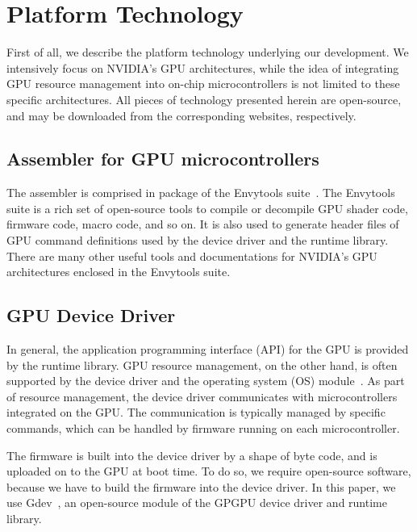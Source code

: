 
\section{Platform Technology}\label{sec:tech}

First of all, we describe the platform technology underlying our
development.
We intensively focus on NVIDIA's GPU architectures, while the idea of
integrating GPU resource management into on-chip microcontrollers is not
limited to these specific architectures.
All pieces of technology presented herein are open-source, and may be
downloaded from the corresponding websites, respectively.

\subsection{Assembler for GPU microcontrollers}\label{sec:envy}

The assembler is comprised in package of the Envytools suite~\cite{envytools}.
The Envytools suite is a rich set of open-source tools to compile or
decompile GPU shader code, firmware code, macro code, and so on. 
It is also used to generate header files of GPU command definitions used
by the device driver and the runtime library.
There are many other useful tools and documentations for NVIDIA's GPU
architectures enclosed in the Envytools suite.

\subsection{GPU Device Driver}\label{sec:driver}

In general, the application programming interface (API) for the GPU is
provided by the runtime library.
GPU resource management, on the other hand, is often supported by the
device driver and the operating system (OS) module~\cite{Kato_ATC11,
Kato_ATC12, Bautin_MCNC08}.
As part of resource management, the device driver communicates with
microcontrollers integrated on the GPU.
The communication is typically managed by specific commands, which can
be handled by firmware running on each microcontroller.

\par
The firmware is built into the device driver by a shape of byte code,
and is uploaded on to the GPU at boot time.
To do so, we require open-source software, because we have to build the
firmware into the device driver.
In this paper, we use Gdev~\cite{Kato_ATC12}, an open-source module of
the GPGPU device driver and runtime library.

